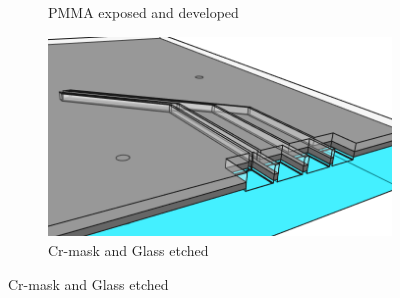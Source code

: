 \documentclass[final]{jyflluk}
\begin{document}
\begin{figure}[H]
\begin{subfigure}{0.48\textwidth}
        \caption{PMMA exposed and developed} \label{fig:process3}
    \end{subfigure}
    \hfill
    \begin{subfigure}{0.48\textwidth}
        \centering
        \includegraphics[width=\linewidth]{steps/4.Etched.png} 
        \caption{Cr-mask and Glass etched} \label{fig:process4}
    \end{subfigure}
    

\end{figure}
\end{document}

